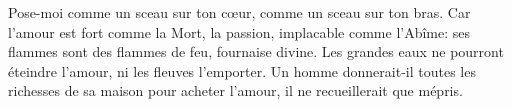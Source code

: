 Pose-moi comme un sceau sur ton cœur, comme un sceau sur ton bras.
Car l’amour est fort comme la Mort, la passion, implacable comme l’Abîme:
	ses flammes sont des flammes de feu, fournaise divine.
Les grandes eaux ne pourront éteindre l’amour,
	ni les fleuves l’emporter.
Un homme donnerait-il toutes les richesses de sa maison pour acheter l’amour,
	il ne recueillerait que mépris.
